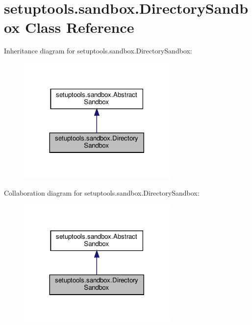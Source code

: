 \hypertarget{classsetuptools_1_1sandbox_1_1DirectorySandbox}{}\section{setuptools.\+sandbox.\+Directory\+Sandbox Class Reference}
\label{classsetuptools_1_1sandbox_1_1DirectorySandbox}


Inheritance diagram for setuptools.\+sandbox.\+Directory\+Sandbox\+:
\nopagebreak
\begin{figure}[H]
\begin{center}
\leavevmode
\includegraphics[width=224pt]{classsetuptools_1_1sandbox_1_1DirectorySandbox__inherit__graph}
\end{center}
\end{figure}


Collaboration diagram for setuptools.\+sandbox.\+Directory\+Sandbox\+:
\nopagebreak
\begin{figure}[H]
\begin{center}
\leavevmode
\includegraphics[width=224pt]{classsetuptools_1_1sandbox_1_1DirectorySandbox__coll__graph}
\end{center}
\end{figure}
